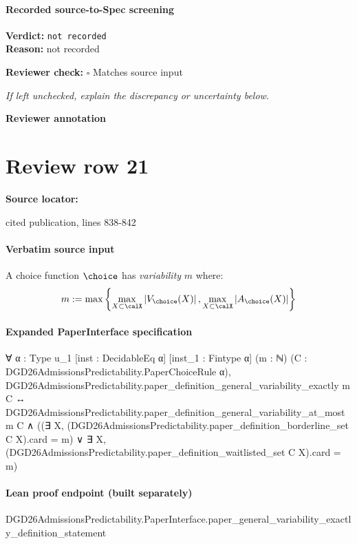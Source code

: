\documentclass[10pt]{article}
\newcommand{\reviewerbox}{%
  \par\noindent\fbox{\parbox{0.96\linewidth}{\rule{0pt}{0.38in}}}\par
}
\newcommand{\reviewmatch}[1]{%
  \par\noindent\textbf{Reviewer check:} $\square$\; #1\par
  \noindent\emph{If left unchecked, explain the discrepancy or uncertainty below.}\par
}
\begin{document}
\paragraph{Recorded source-to-Spec screening}
\textbf{Verdict:} \texttt{not recorded}
\\
\textbf{Reason:} not recorded
\reviewmatch{Matches source input}
\noindent\textbf{Reviewer annotation}\par
\reviewerbox
\clearpage
\hypertarget{source-claim-d2f6a286dc057af6}{}
\section*{Review row 21}
\textbf{Source locator:} {\footnotesize\raggedright cited publication, lines 838-\allowbreak{}842\par}
\paragraph{Verbatim source input}
\begin{ReviewVerbatim}
\begin{definition}
\label{def:variability-general}
A choice function $\choice$ has \textit{variability} $m$ where:
$$m := \max\left\{\max_{X\subset \calX} \left|V_\choice(X)\right|, \max_{X\subset \calX} \left|A_\choice(X)\right| \right\}$$
\end{definition}
\end{ReviewVerbatim}


\paragraph{Expanded PaperInterface specification}
\begin{ReviewVerbatim}
∀ {α : Type u_1} [inst : DecidableEq α] [inst_1 : Fintype α] (m : ℕ)
  (C : DGD26AdmissionsPredictability.PaperChoiceRule α),
  DGD26AdmissionsPredictability.paper_definition_general_variability_exactly m C ↔
    DGD26AdmissionsPredictability.paper_definition_general_variability_at_most m C ∧
      ((∃ X, (DGD26AdmissionsPredictability.paper_definition_borderline_set C X).card = m) ∨
        ∃ X, (DGD26AdmissionsPredictability.paper_definition_waitlisted_set C X).card = m)
\end{ReviewVerbatim}

\paragraph{Lean proof endpoint (built separately)}\begin{ReviewVerbatim}
DGD26AdmissionsPredictability.PaperInterface.paper_general_variability_exactly_definition_statement
\end{ReviewVerbatim}
\end{document}
